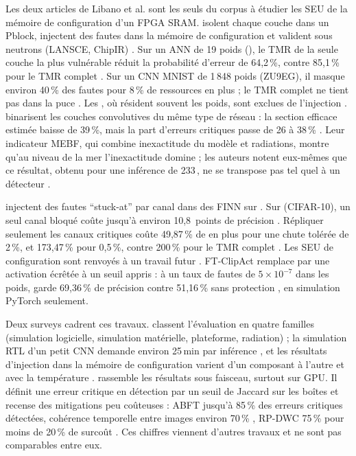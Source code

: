 Les deux articles de Libano et al. sont les seuls du corpus à étudier les SEU de la mémoire
de configuration d'un FPGA SRAM.
\citet{2019-libano-selective-hardening-neural-networks-fpgas} isolent chaque couche dans un
Pblock, injectent des fautes dans la mémoire de configuration et valident sous neutrons
(LANSCE, ChipIR) . Sur un ANN de 19 poids (), le TMR de la seule couche la
plus vulnérable réduit la probabilité d'erreur de 64,2\,\%, contre 85,1\,\% pour le TMR
complet . Sur un CNN MNIST de 1\,848 poids (ZU9EG), il masque environ
40\,\% des fautes pour 8\,\% de ressources en plus ; le TMR complet ne tient pas dans la
puce . Les , où résident souvent les poids, sont exclues de l'injection
. \citet{2020-libano-understanding-impact-quantization-accuracy-radiation}
binarisent les couches convolutives du même type de réseau : la section efficace estimée
baisse de 39\,\%, mais la part d'erreurs critiques passe de 26 à 38\,\% . Leur
indicateur MEBF, qui combine inexactitude du modèle et radiations, montre qu'au niveau de la
mer l'inexactitude domine  ; les auteurs notent eux-mêmes que ce
résultat, obtenu pour une inférence de 233\,, ne se transpose pas tel quel à un détecteur
.

\citet{arxiv-1912.07394-efficient-error-tolerant-quantized-neural} injectent des fautes
\enquote{stuck-at} par canal dans des  FINN sur . Sur  (CIFAR-10), un seul
canal bloqué coûte jusqu'à environ 10,8~points de précision . Répliquer
seulement les canaux critiques coûte 49,87\,\% de  en plus pour une chute tolérée de
2\,\%, et 173,47\,\% pour 0,5\,\%, contre 200\,\% pour le TMR complet . Les
SEU de configuration sont renvoyés à un travail futur . FT-ClipAct
\citep{arxiv-1912.00941-ft-clipact-resilience-analysis-deep}\pp{} remplace  par une
activation écrêtée à un seuil appris : à un taux de fautes de $5\times10^{-7}$ dans les
poids,  garde 69,36\,\% de précision contre 51,16\,\% sans protection , en simulation PyTorch seulement.

Deux surveys cadrent ces travaux. \citet{2023-ruospo-survey-deep-learning-resilience-assessment}
classent l'évaluation en quatre familles (simulation logicielle, simulation matérielle,
plateforme, radiation)  ; la simulation RTL d'un petit CNN demande environ
25\,min par inférence , et les résultats d'injection dans la mémoire de
configuration varient d'un composant à l'autre et avec la température . \citet{2024-rech-artificial-neural-networks-space-safety} rassemble les
résultats sous faisceau, surtout sur GPU. Il définit une erreur critique en détection par
un seuil de Jaccard sur les boîtes  et recense des mitigations peu coûteuses :
ABFT jusqu'à 85\,\% des erreurs critiques détectées, cohérence temporelle entre images
environ 70\,\% , RP-DWC 75\,\% pour moins de 20\,\% de surcoût . Ces
chiffres viennent d'autres travaux et ne sont pas comparables entre eux.

